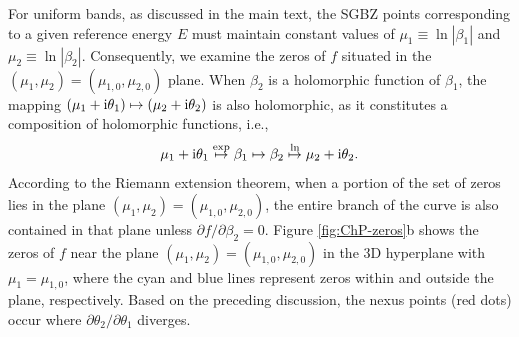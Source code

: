 For uniform bands, as discussed in the main text, the SGBZ points
corresponding to a given reference energy $E$ must maintain constant
values of $\mu_{1}\equiv\ln|\beta_{1}|$ and $\mu_{2}\equiv\ln|\beta_{2}|$.
Consequently, we examine the zeros of $f$ situated in the $(\mu_{1},\mu_{2})=(\mu_{1,0},\mu_{2,0})$
plane. When $\beta_{2}$ is a holomorphic function of $\beta_{1}$,
the mapping $(\mu_{1}+\mathrm{i}\theta_{1})\mapsto(\mu_{2}+\mathrm{i}\theta_{2})$
is also holomorphic, as it constitutes a composition of holomorphic
functions, i.e., 
\begin{equation}
\mu_{1}+\mathrm{i}\theta_{1}\overset{\exp}{\mapsto}\beta_{1}\mapsto\beta_{2}\overset{\ln}{\mapsto}\mu_{2}+\mathrm{i}\theta_{2}.
\end{equation}
According to the Riemann extension theorem, when a portion of the
set of zeros lies in the plane $(\mu_{1},\mu_{2})=(\mu_{1,0},\mu_{2,0})$,
the entire branch of the curve is also contained in that plane unless
$\partial f/\partial\beta_{2}=0$. Figure \ref{fig:ChP-zeros}b shows
the zeros of $f$ near the plane $(\mu_{1},\mu_{2})=(\mu_{1,0},\mu_{2,0})$
in the 3D hyperplane with $\mu_{1}=\mu_{1,0}$, where the cyan and
blue lines represent zeros within and outside the plane, respectively.
Based on the preceding discussion, the nexus points (red dots) occur
where $\partial\theta_{2}/\partial\theta_{1}$ diverges.


